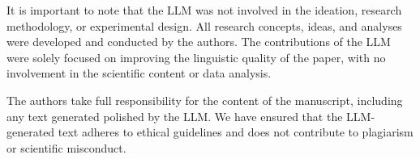 \documentclass{article} %
\begin{document}
It is important to note that the LLM was not involved in the ideation, research methodology, or experimental design. All research concepts, ideas, and analyses were developed and conducted by the authors. The contributions of the LLM were solely focused on improving the linguistic quality of the paper, with no involvement in the scientific content or data analysis.

The authors take full responsibility for the content of the manuscript, including any text generated polished by the LLM. We have ensured that the LLM-generated text adheres to ethical guidelines and does not contribute to plagiarism or scientific misconduct.
\end{document}
